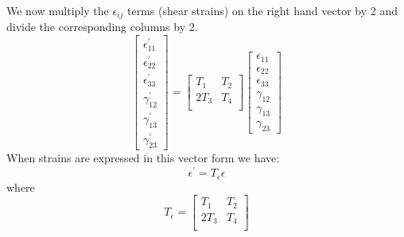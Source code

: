 \documentclass{article}
\begin{document}
We now multiply the $\epsilon_{ij}$ terms (shear strains) on the right hand vector by 2 and divide the corresponding columns by 2.
\begin{equation}
\begin{bmatrix}
\epsilon_{11}^\prime \\
\epsilon_{22}^\prime \\
\epsilon_{33}^\prime \\
\gamma_{12}^\prime \\
\gamma_{13}^\prime \\
\gamma_{23}^\prime
\end{bmatrix}
=
\begin{bmatrix}
T_1 & T_2 \\
2T_3 & T_4 \\
\end{bmatrix}
\begin{bmatrix}
\epsilon_{11} \\
\epsilon_{22} \\
\epsilon_{33} \\
\gamma_{12} \\
\gamma_{13} \\
\gamma_{23}
\end{bmatrix}
\end{equation}
When strains are expressed in this vector form we have:
\begin{equation}
\epsilon^\prime = T_\epsilon \epsilon
\end{equation}
where
\begin{equation}
T_\epsilon =
\begin{bmatrix}
    T_1 & T_2 \\
    2 T_3 & T_4 \\
\end{bmatrix}
\label{eq:Tepsilon2}
\end{equation}
\end{document}
